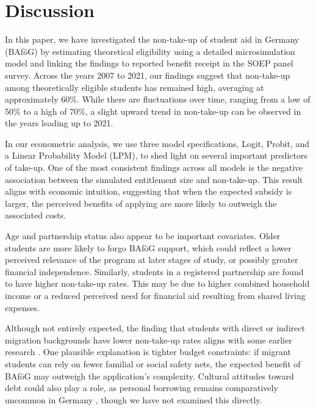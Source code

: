 \section{Discussion}

In this paper, we have investigated the non-take-up of student aid in Germany (BAföG) by estimating theoretical eligibility using a detailed microsimulation model and linking the findings to reported benefit receipt in the SOEP panel survey. Across the years 2007 to 2021, our findings suggest that non-take-up among theoretically eligible students has remained high, averaging at approximately 60\%. While there are fluctuations over time, ranging from a low of 50\% to a high of 70\%, a slight upward trend in non-take-up can be observed in the years leading up to 2021.

In our econometric analysis, we use three model specifications, Logit, Probit, and a Linear Probability Model (LPM), to shed light on several important predictors of take-up. One of the most consistent findings across all models is the negative association between the simulated entitlement size and non-take-up. This result aligns with economic intuition, suggesting that when the expected subsidy is larger, the perceived benefits of applying are more likely to outweigh the associated costs.

Age and partnership status also appear to be important covariates. 
Older students are more likely to forgo BAföG support, which could reflect a lower perceived relevance of the program at later stages of study, or possibly greater financial independence. 
Similarly, students in a registered partnership are found to have higher non-take-up rates. 
This may be due to higher combined household income or a reduced perceived need for financial aid resulting from shared living expenses.


Although not entirely expected, the finding that students with direct or indirect migration backgrounds have lower non-take-up rates aligns with some earlier research \citep{herber_non-take-up_2019, konijn_quantifying_2023}. One plausible explanation is tighter budget constraints: if migrant students can rely on fewer familial or social safety nets, the expected benefit of BAföG may outweigh the application’s complexity. Cultural attitudes toward debt could also play a role, as personal borrowing remains comparatively uncommon in Germany \citep{seabrooke_germany_2017}, though we have not examined this directly. 

